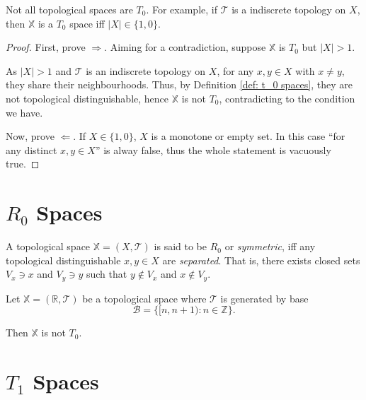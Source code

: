 \begin{example}
	Not all topological spaces are $T_0$. For example, if $\mathcal T$ is a indiscrete topology on $X$, then $\mathbb X$ is a $T_0$ space iff $|X| \in \{1, 0\}$.
	
	\begin{proof}
		First, prove $\Rightarrow$. Aiming for a contradiction, suppose $\mathbb X$ is $T_0$ but $|X| > 1$.
		
		As $|X| > 1$ and $\mathcal T$ is an indiscrete topology on $X$, for any $x, y \in X$ with $x \ne y$, they share their neighbourhoods. Thus, by Definition \ref{def: t_0 spaces}, they are not topological distinguishable, hence $\mathbb X$ is not $T_0$, contradicting to the condition we have.
		
		Now, prove $\Leftarrow$. If $X \in \{1, 0\}$, $X$ is a monotone or empty set. In this case ``for any distinct $x, y \in X$'' is alway false, thus the whole statement is vacuously true.
	\end{proof}
\end{example}


\section{$R_0$ Spaces}


\begin{definition}
	\label{def: R_0 spaces}
	A topological space $\mathbb X = (X, \mathcal T)$ is said to be $R_0$ or \textit{symmetric}, iff any topological distinguishable $x, y \in X$ are \textit{separated}. That is, there exists closed sets $V_x \ni x$ and $V_y \ni y$ such that $y \notin V_x$ and $x \notin V_y$.
\end{definition}


\begin{example}
	Let $\mathbb X = (\mathbb R, \mathcal T)$ be a topological space where $\mathcal T$ is generated by base
	$$
	\mathcal B = \{ [n, n + 1) : n \in \mathbb Z \}.
	$$
	
	Then $\mathbb X$ is not $T_0$.
\end{example}


\section{$T_1$ Spaces}


